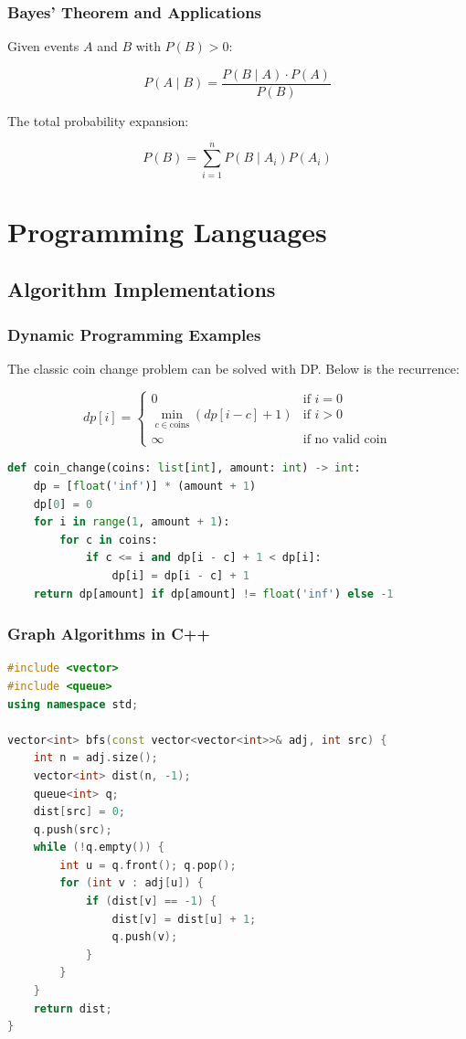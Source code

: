 \subsubsection{Bayes' Theorem and Applications}

Given events $A$ and $B$ with $P(B) > 0$:

$$P(A \mid B) = \frac{P(B \mid A) \cdot P(A)}{P(B)}$$

The total probability expansion:

$$P(B) = \sum_{i=1}^{n} P(B \mid A_i) P(A_i)$$


\section{Programming Languages}

\subsection{Algorithm Implementations}

\subsubsection{Dynamic Programming Examples}

The classic coin change problem can be solved with DP. Below is the recurrence:

$$dp[i] = \begin{cases}
0 & \text{if } i = 0 \\
\min_{c \in \text{coins}} (dp[i - c] + 1) & \text{if } i > 0 \\
\infty & \text{if no valid coin}
\end{cases}$$

\begin{lstlisting}[language=Python]
def coin_change(coins: list[int], amount: int) -> int:
    dp = [float('inf')] * (amount + 1)
    dp[0] = 0
    for i in range(1, amount + 1):
        for c in coins:
            if c <= i and dp[i - c] + 1 < dp[i]:
                dp[i] = dp[i - c] + 1
    return dp[amount] if dp[amount] != float('inf') else -1
\end{lstlisting}

\subsubsection{Graph Algorithms in C++}

\begin{lstlisting}[language=C++]
#include <vector>
#include <queue>
using namespace std;

vector<int> bfs(const vector<vector<int>>& adj, int src) {
    int n = adj.size();
    vector<int> dist(n, -1);
    queue<int> q;
    dist[src] = 0;
    q.push(src);
    while (!q.empty()) {
        int u = q.front(); q.pop();
        for (int v : adj[u]) {
            if (dist[v] == -1) {
                dist[v] = dist[u] + 1;
                q.push(v);
            }
        }
    }
    return dist;
}
\end{lstlisting}

